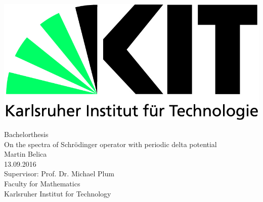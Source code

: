\begin{titlepage}

    \includegraphics[scale=0.45,left]{kit-logo.jpg}  \\[2.5cm] 

	\begin{center}
 		{\Large Bachelorthesis} \\[2cm] 
    
    	{\Huge On the spectra of Schrödinger operator with periodic delta potential} \\[2.5cm]

    	{\Large Martin Belica} \\[0.75cm]
    	{\Large 13.09.2016} \\[3.5cm]


    	{\Large Supervisor: Prof. Dr. Michael Plum} \\[0.75cm]
    	{\Large Faculty for Mathematics} \\[0.75cm]
    	{\Large Karlsruher Institut for Technology} \vfill 
  \end{center}

\end{titlepage}